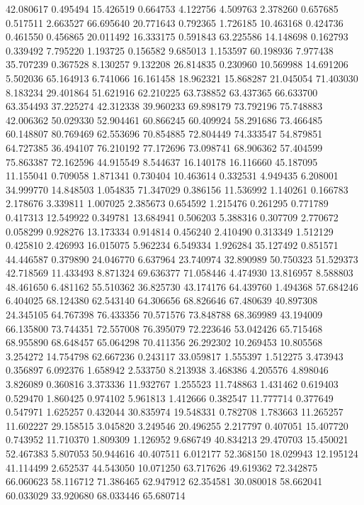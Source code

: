 42.080617
0.495494
15.426519
0.664753
4.122756
4.509763
2.378260
0.657685
0.517511
2.663527
66.695640
20.771643
0.792365
1.726185
10.463168
0.424736
0.461550
0.456865
20.011492
16.333175
0.591843
63.225586
14.148698
0.162793
0.339492
7.795220
1.193725
0.156582
9.685013
1.153597
60.198936
7.977438
35.707239
0.367528
8.130257
9.132208
26.814835
0.230960
10.569988
14.691206
5.502036
65.164913
6.741066
16.161458
18.962321
15.868287
21.045054
71.403030
8.183234
29.401864
51.621916
62.210225
63.738852
63.437365
66.633700
63.354493
37.225274
42.312338
39.960233
69.898179
73.792196
75.748883
42.006362
50.029330
52.904461
60.866245
60.409924
58.291686
73.466485
60.148807
80.769469
62.553696
70.854885
72.804449
74.333547
54.879851
64.727385
36.494107
76.210192
77.172696
73.098741
68.906362
57.404599
75.863387
72.162596
44.915549
8.544637
16.140178
16.116660
45.187095
11.155041
0.709058
1.871341
0.730404
10.463614
0.332531
4.949435
6.208001
34.999770
14.848503
1.054835
71.347029
0.386156
11.536992
1.140261
0.166783
2.178676
3.339811
1.007025
2.385673
0.654592
1.215476
0.261295
0.771789
0.417313
12.549922
0.349781
13.684941
0.506203
5.388316
0.307709
2.770672
0.058299
0.928276
13.173334
0.914814
0.456240
2.410490
0.313349
1.512129
0.425810
2.426993
16.015075
5.962234
6.549334
1.926284
35.127492
0.851571
44.446587
0.379890
24.046770
6.637964
23.740974
32.890989
50.750323
51.529373
42.718569
11.433493
8.871324
69.636377
71.058446
4.474930
13.816957
8.588803
48.461650
6.481162
55.510362
36.825730
43.174176
64.439760
1.494368
57.684246
6.404025
68.124380
62.543140
64.306656
68.826646
67.480639
40.897308
24.345105
64.767398
76.433356
70.571576
73.848788
68.369989
43.194009
66.135800
73.744351
72.557008
76.395079
72.223646
53.042426
65.715468
68.955890
68.648457
65.064298
70.411356
26.292302
10.269453
10.805568
3.254272
14.754798
62.667236
0.243117
33.059817
1.555397
1.512275
3.473943
0.356897
6.092376
1.658942
2.533750
8.213938
3.468386
4.205576
4.898046
3.826089
0.360816
3.373336
11.932767
1.255523
11.748863
1.431462
0.619403
0.529470
1.860425
0.974102
5.961813
1.412666
0.382547
11.777714
0.377649
0.547971
1.625257
0.432044
30.835974
19.548331
0.782708
1.783663
11.265257
11.602227
29.158515
3.045820
3.249546
20.496255
2.217797
0.407051
15.407720
0.743952
11.710370
1.809309
1.126952
9.686749
40.834213
29.470703
15.450021
52.467383
5.807053
50.944616
40.407511
6.012177
52.368150
18.029943
12.195124
41.114499
2.652537
44.543050
10.071250
63.717626
49.619362
72.342875
66.060623
58.116712
71.386465
62.947912
62.354581
30.080018
58.662041
60.033029
33.920680
68.033446
65.680714
